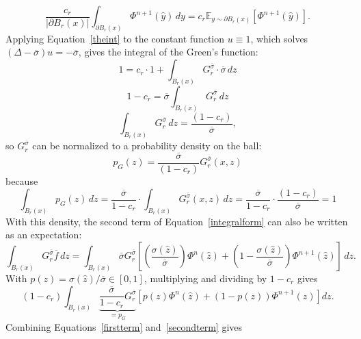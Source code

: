 \documentclass[
]{elteiktdk}[2024/04/26]
\begin{document}
	\begin{equation}
		\label{firstterm}
		\frac{c_r}{|\partial B_r(x)|}\int_{\partial B_r(x)}\Phi^{n+1}(\hat{y})\,dy = c_r\mathbb{E}_{y \sim \partial B_r(x)}\left[\Phi^{n+1}(\hat{y})\right].
	\end{equation}
	Applying Equation~\eqref{theint} to the constant function $u\equiv1$, which solves $(\Delta-\overline\sigma)u=-\overline\sigma$, gives the integral of the Green's function:
	\begin{equation}
		1 = c_r \cdot 1 + \int_{B_r(x)} G^{\overline{\sigma}}_r \cdot \overline{\sigma} \, dz
	\end{equation}
		\begin{equation}
		1 - c_r = \overline{\sigma} \int_{B_r(x)} G^{\overline{\sigma}}_r \, dz
	\end{equation}
	\begin{equation}
		\int_{B_r(x)}G^{\overline\sigma}_r\,dz = \frac{(1-c_r)}{\overline\sigma},
	\end{equation}
	so $G^{\overline\sigma}_r$ can be normalized to a probability density on the ball:
	\begin{equation}
		p_G(z)= \frac{\overline\sigma}{(1-c_r)} G^{\overline\sigma}_r(x,z)
	\end{equation}
	because
	\begin{equation}
		\int_{B_r(x)} p_G(z) \, dz = \frac{\overline{\sigma}}{1 - c_r} \cdot \int_{B_r(x)} G^{\overline\sigma}_r(x,z) \, dz = \frac{\overline{\sigma}}{1 - c_r} \cdot \frac{(1-c_r)}{\overline{\sigma}} = 1
	\end{equation}
	With this density, the second term of Equation~\eqref{integralform} can also be written as an expectation:
	\begin{equation}
		\int_{B_r(x)} G^{\overline{\sigma}}_r \overline{f} \, dz = \int_{B_r(x)} \overline{\sigma}G^{\overline{\sigma}}_r \left[\left(\frac{\sigma(\hat{z})}{\overline\sigma}\right) \Phi^n(\hat{z}) + \left(1 - \frac{\sigma(\hat{z})}{\overline{\sigma}}\right)\Phi^{n+1}(\hat{z})\right] \, dz.
	\end{equation}
	With $p(z)=\sigma(\hat{z})/\overline\sigma \in[0,1]$, multiplying and dividing by $1-c_r$ gives
	\begin{equation}
		\label{secondterm}
		(1 - c_r)\int_{B_r(x)} \underbrace{\frac{\overline{\sigma}}{1 - c_r} G^{\overline{\sigma}}_r}_{ = p_G} \left[p(z) \Phi^n(\hat{z}) + (1 - p(z)) \Phi^{n+1}(\hat{z})\right] dz.
	\end{equation}
	Combining Equations~\eqref{firstterm} and~\eqref{secondterm} gives
\end{document}
